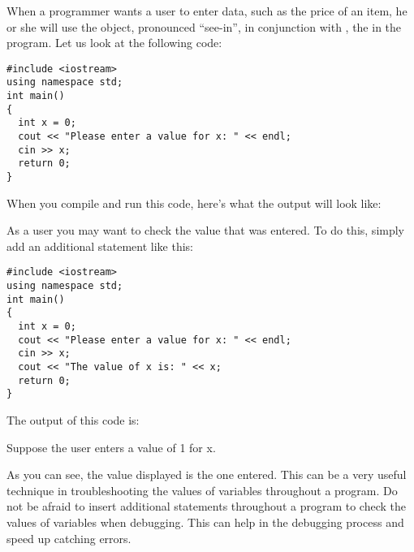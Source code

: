 
When a programmer wants a user to enter data, such as the price of an item, he or she will use the  object, pronounced ``see-in'', in conjunction with \Code{>>}, the  in the program. 
Let us look at the following code:

\noindent\begin{minipage}{\linewidth}\begin{lstlisting}
#include <iostream>
using namespace std;
int main()
{
  int x = 0;   				      
  cout << "Please enter a value for x: " << endl; 
  cin >> x;
  return 0;
}
\end{lstlisting}\end{minipage}

When you compile and run this code, here's what the output will look like:

\noindent {}

As a user you may want to check the value that was entered. 
To do this, simply add an additional  statement like this: \nopagebreak[4]

\noindent\begin{minipage}{\linewidth}\begin{lstlisting}
#include <iostream>
using namespace std;
int main()
{
  int x = 0;   				      
  cout << "Please enter a value for x: " << endl; 
  cin >> x;
  cout << "The value of x is: " << x;
  return 0;
}
\end{lstlisting}\end{minipage}

\noindent The output of this code is:

\noindent {}

\noindent Suppose the user enters a value of 1 for x.

\noindent {}

As you can see, the value displayed is the one entered. 
This can be a very useful technique in troubleshooting the values of variables throughout a program. 
Do not be afraid to insert additional  statements throughout a program to check the values of variables when debugging. 
This can help in the debugging process and speed up catching errors. 

